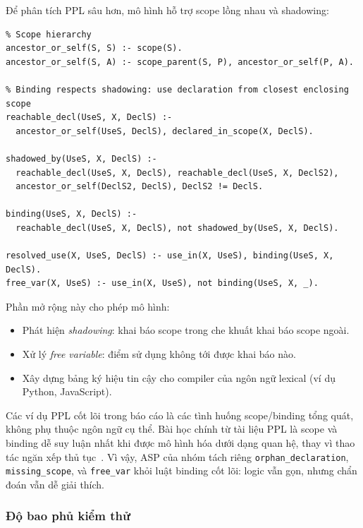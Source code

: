 \documentclass[a4paper,11pt]{article}
\begin{document}
Để phân tích PPL sâu hơn, mô hình hỗ trợ scope lồng nhau và shadowing:
\begin{lstlisting}
% Scope hierarchy
ancestor_or_self(S, S) :- scope(S).
ancestor_or_self(S, A) :- scope_parent(S, P), ancestor_or_self(P, A).

% Binding respects shadowing: use declaration from closest enclosing scope
reachable_decl(UseS, X, DeclS) :- 
  ancestor_or_self(UseS, DeclS), declared_in_scope(X, DeclS).

shadowed_by(UseS, X, DeclS) :- 
  reachable_decl(UseS, X, DeclS), reachable_decl(UseS, X, DeclS2),
  ancestor_or_self(DeclS2, DeclS), DeclS2 != DeclS.

binding(UseS, X, DeclS) :- 
  reachable_decl(UseS, X, DeclS), not shadowed_by(UseS, X, DeclS).

resolved_use(X, UseS, DeclS) :- use_in(X, UseS), binding(UseS, X, DeclS).
free_var(X, UseS) :- use_in(X, UseS), not binding(UseS, X, _).
\end{lstlisting}

Phần mở rộng này cho phép mô hình:
\begin{itemize}
  \item Phát hiện \textit{shadowing}: khai báo scope trong che khuất khai báo scope ngoài.
  \item Xử lý \textit{free variable}: điểm sử dụng không tới được khai báo nào.
  \item Xây dựng bảng ký hiệu tin cậy cho compiler của ngôn ngữ lexical (ví dụ Python, JavaScript).
\end{itemize}
Các ví dụ PPL cốt lõi trong báo cáo là các tình huống scope/binding tổng quát, không phụ thuộc ngôn ngữ cụ thể.
Bài học chính từ tài liệu PPL là scope và binding dễ suy luận nhất khi được mô hình hóa dưới dạng quan hệ,
thay vì thao tác ngăn xếp thủ tục~\cite{Gabbrielli2023}. Vì vậy, ASP của nhóm tách riêng
\texttt{orphan\_declaration}, \texttt{missing\_scope}, và \texttt{free\_var} khỏi luật binding cốt lõi:
logic vẫn gọn, nhưng chẩn đoán vẫn dễ giải thích.


\subsubsection*{Độ bao phủ kiểm thử}
\end{document}
